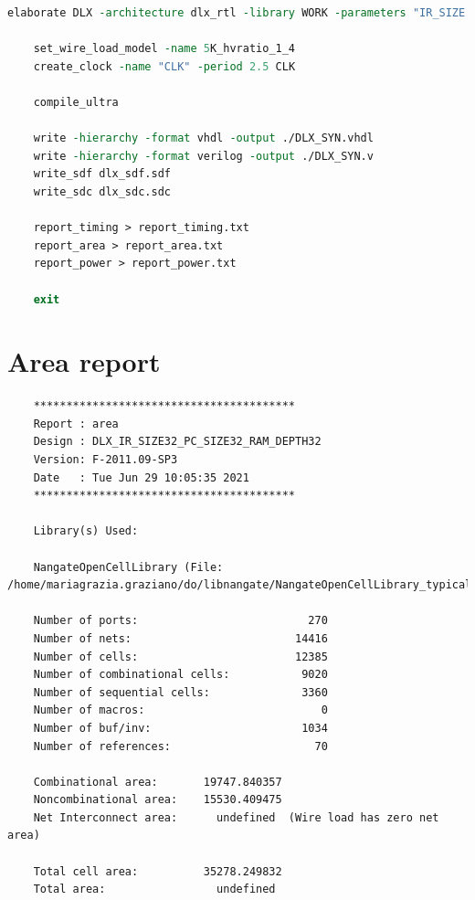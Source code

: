 \begin{lstlisting}[language=tcl,caption={TCL script for the DLX synthesis},label=tcl_syn]
	elaborate DLX -architecture dlx_rtl -library WORK -parameters "IR_SIZE = 32, PC_SIZE = 32, RAM_DEPTH = 32"
	
	set_wire_load_model -name 5K_hvratio_1_4
	create_clock -name "CLK" -period 2.5 CLK
	
	compile_ultra
	
	write -hierarchy -format vhdl -output ./DLX_SYN.vhdl
	write -hierarchy -format verilog -output ./DLX_SYN.v
	write_sdf dlx_sdf.sdf
	write_sdc dlx_sdc.sdc
	
	report_timing > report_timing.txt
	report_area > report_area.txt
	report_power > report_power.txt
	
	exit
\end{lstlisting}


\newappendix\label{ap3}
\section{Area report}
\begin{lstlisting}
	****************************************
	Report : area
	Design : DLX_IR_SIZE32_PC_SIZE32_RAM_DEPTH32
	Version: F-2011.09-SP3
	Date   : Tue Jun 29 10:05:35 2021
	****************************************
	
	Library(s) Used:
	
	NangateOpenCellLibrary (File: /home/mariagrazia.graziano/do/libnangate/NangateOpenCellLibrary_typical_ecsm.db)
	
	Number of ports:                          270
	Number of nets:                         14416
	Number of cells:                        12385
	Number of combinational cells:           9020
	Number of sequential cells:              3360
	Number of macros:                           0
	Number of buf/inv:                       1034
	Number of references:                      70
	
	Combinational area:       19747.840357
	Noncombinational area:    15530.409475
	Net Interconnect area:      undefined  (Wire load has zero net area)
	
	Total cell area:          35278.249832
	Total area:                 undefined
\end{lstlisting}


